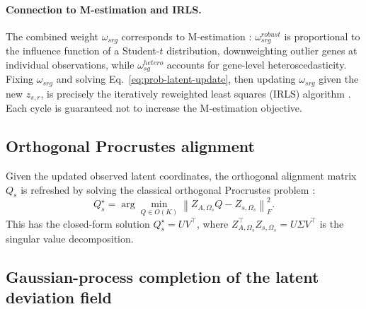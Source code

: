 \documentclass[11pt]{article}
\numberwithin{equation}{section}
\begin{document}
\paragraph{Connection to M-estimation and IRLS.}
The combined weight $\omega_{srg}$ corresponds to M-estimation
\cite{huber1981robust}: $\omega_{srg}^{robust}$ is proportional to the influence
function of a Student-$t$ distribution, downweighting outlier genes at individual
observations, while $\omega_{sg}^{hetero}$ accounts for gene-level heteroscedasticity.
Fixing $\omega_{srg}$ and solving Eq.~\eqref{eq:prob-latent-update}, then updating
$\omega_{srg}$ given the new $z_{s,r}$, is precisely the iteratively reweighted least
squares (IRLS) algorithm \cite{huber1981robust}.  Each cycle is guaranteed not to
increase the M-estimation objective.

\subsection{Orthogonal Procrustes alignment}
\label{sec:procrustes}

Given the updated observed latent coordinates, the orthogonal alignment matrix $Q_s$
is refreshed by solving the classical orthogonal Procrustes problem
\cite{schonemann1966procrustes}:
\begin{equation}
  \label{eq:prob-procrustes}
  Q_s^\star
  =
  \arg\min_{Q\in O(K)}
  \left\|
  Z_{A,\Omega_s}Q - Z_{s,\Omega_s}
  \right\|_F^2.
\end{equation}
This has the closed-form solution $Q_s^\star = UV^\top$, where
$Z_{A,\Omega_s}^\top Z_{s,\Omega_s} = U\Sigma V^\top$ is the singular value
decomposition.

\subsection{Gaussian-process completion of the latent deviation field}
\label{sec:gp-completion}
\end{document}
